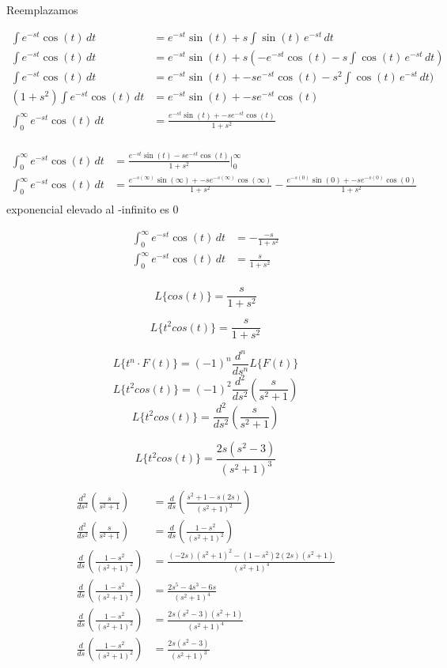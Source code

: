\documentclass{article}
\begin{document}
Reemplazamos

\begin{align*}
\int e^{-st} \cos(t) \, dt &= e^{-st} \sin(t) + s \int \sin(t) \, e^{-st} \, dt \\
\int e^{-st} \cos(t) \, dt &= e^{-st} \sin(t) + s(-e^{-st} \cos(t) - s \int \cos(t) \, e^{-st} \, dt) \\
\int e^{-st} \cos(t) \, dt &= e^{-st} \sin(t) + -se^{-st} \cos(t) - s^{2} \int \cos(t) \, e^{-st} \, dt) \\
(1+s^{2})\int e^{-st} \cos(t) \, dt &= e^{-st} \sin(t) + -se^{-st} \cos(t)\\
\int_{0}^{\infty} e^{-st} \cos(t) \, dt &= \frac{e^{-st} \sin(t) + -se^{-st} \cos(t)}{1+s^{2}}\\
\end{align*}

\begin{align*}
\int_{0}^{\infty} e^{-st} \cos(t) \, dt &= \frac{e^{-st} \sin(t) - se^{-st}\cos(t)}{1+s^{2}} \Bigg|_{0}^{\infty} \\
\int_{0}^{\infty} e^{-st} \cos(t) \, dt &= \frac{e^{-s(\infty)} \sin(\infty) + -se^{-s(\infty)} \cos(\infty)}{1+s^{2}} - \frac{e^{-s(0)} \sin(0) + -se^{-s(0)} \cos(0)}{1+s^{2}}\\
\end{align*}
exponencial elevado al -infinito es 0

\begin{align*}
\int_{0}^{\infty} e^{-st} \cos(t) \, dt &= - \frac{-s}{1+s^{2}}\\
\int_{0}^{\infty} e^{-st} \cos(t) \, dt &= \frac{s}{1+s^{2}}\\
\end{align*}

\[ L\{cos(t)\} = \frac{s}{1+s^{2}}\]

\[ L\{t^{2}cos(t)\} = \frac{s}{1+s^{2}}\]

\[ L\{t^n \cdot F(t)\} = (-1)^n \frac{d^n}{ds^n} L\{F(t)\} \]
\[ L\{t^{2}cos(t)\} = (-1)^2 \frac{d^2}{ds^2} (\frac{s}{s^2+1}) \]
\[ L\{t^{2}cos(t)\} = \frac{d^2}{ds^2} (\frac{s}{s^2+1}) \]


\[ L\{t^{2}cos(t)\} = \frac{2s(s^2-3)}{(s^2+1)^3} \]

\begin{align*}
    \frac{d^2}{ds^2} (\frac{s}{s^2+1}) &= \frac{d}{ds}(\frac{s^2+1-s(2s)}{(s^2+1)^2})\\
    \frac{d^2}{ds^2} (\frac{s}{s^2+1}) &= \frac{d}{ds}(\frac{1-s^2}{(s^2+1)^2})\\
    \frac{d}{ds}(\frac{1-s^2}{(s^2+1)^2}) &= \frac{(-2s)(s^2+1)^2-(1-s^2)2(2s)(s^2+1)}{(s^2+1)^4}\\
    \frac{d}{ds}(\frac{1-s^2}{(s^2+1)^2}) &= \frac{2s^5-4s^3-6s}{(s^2+1)^4}\\
    \frac{d}{ds}(\frac{1-s^2}{(s^2+1)^2}) &= \frac{2s(s^2-3)(s^2+1)}{(s^2+1)^4}\\
    \frac{d}{ds}(\frac{1-s^2}{(s^2+1)^2}) &= \frac{2s(s^2-3)}{(s^2+1)^3}\\
\end{align*}
\end{document}

